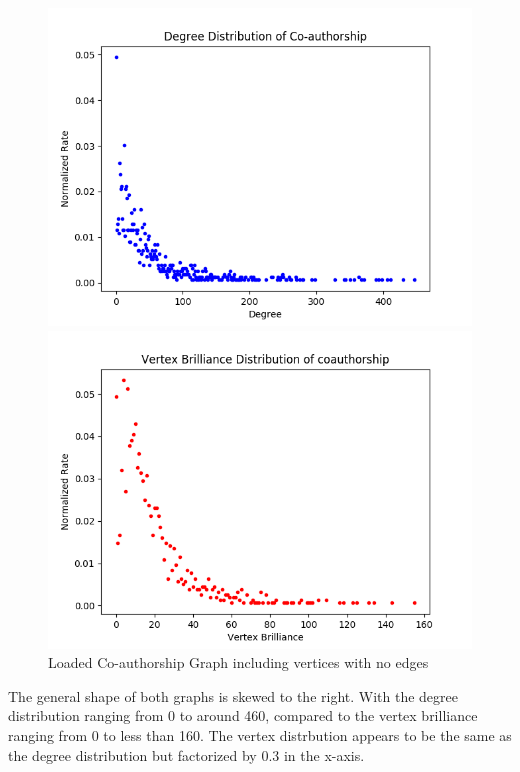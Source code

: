\documentclass[11pt,a4paper,notitlepage]{article}
\begin{document}
\begin{figure}[H]
    \centering
    \begin{minipage}{0.49\textwidth}
        \centering
        \includegraphics[width=1\textwidth]{coauthorship-vertex-degree.png}
    \end{minipage}
    \begin{minipage}{0.49\textwidth}
        \centering
        \includegraphics[width=1\textwidth]{coauthorship-vertex-brilliance.png}
    \end{minipage} \hfill
    \caption{Loaded Co-authorship Graph including vertices with no edges}
\end{figure}
The general shape of both graphs is skewed to the right. With the degree distribution ranging from 0 to around 460, compared to the vertex brilliance ranging from 0 to less than 160. The vertex distrbution appears to be the same as the degree distribution but factorized by 0.3 in the x-axis.
\end{document}
